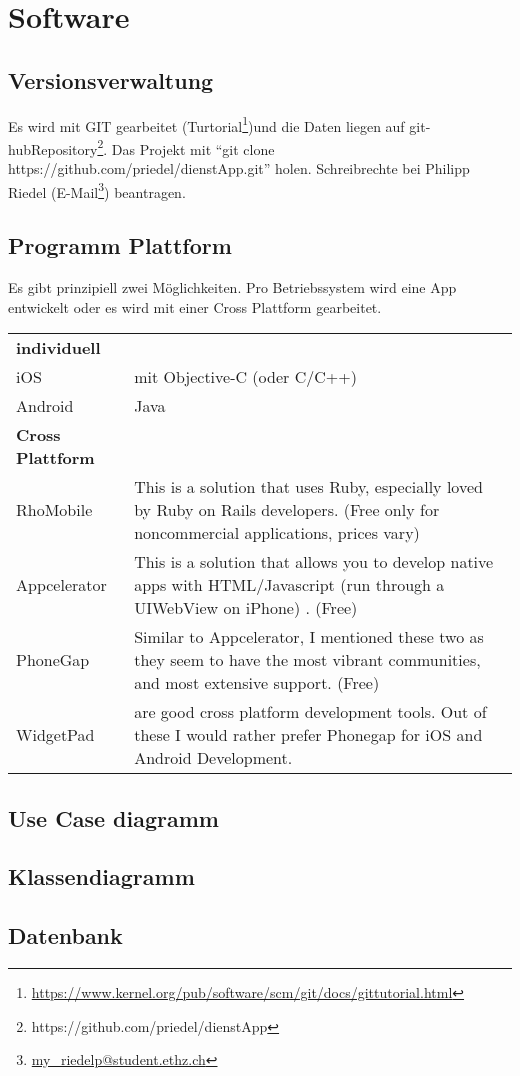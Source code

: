 \chapter{Software}

\section{Versionsverwaltung}
Es wird mit GIT gearbeitet (Turtorial\footnote{\url{https://www.kernel.org/pub/software/scm/git/docs/gittutorial.html}})und die Daten liegen auf git-hub{Repository\footnote{https://github.com/priedel/dienstApp}}. Das Projekt mit \enquote{git clone https://github.com/priedel/dienstApp.git} holen.
 Schreibrechte bei Philipp Riedel (E-Mail\footnote{\href{mailto:riedelp@student.ethz.ch}{my\_riedelp@student.ethz.ch}}) beantragen.

\section{Programm Plattform}

Es gibt prinzipiell zwei Möglichkeiten. Pro Betriebssystem wird eine App entwickelt oder es wird mit einer Cross Plattform gearbeitet\cite{appEinf}.


\begin{tabularx}{\textwidth}{lX}
\textbf{individuell}\cite{appEinf}&\\
iOS & mit  Objective-C (oder C/C++)\\
Android & Java \\
\textbf{Cross Plattform}\cite{crossPlat}&\\
    RhoMobile & This is a solution that uses Ruby, especially loved by Ruby on Rails developers. (Free only for noncommercial applications, prices vary)\\
    Appcelerator & This is a solution that allows you to develop native apps with HTML/Javascript (run through a UIWebView on iPhone) . (Free)\\
    PhoneGap & Similar to Appcelerator, I mentioned these two as they seem to have the most vibrant communities, and most extensive support. (Free)\\
    WidgetPad & are good cross platform development tools. Out of these I would rather prefer Phonegap for iOS and Android Development.\\
\end{tabularx}
\centering{{$\vdots$}}

\section{Use Case diagramm}
\section{Klassendiagramm}

\section{Datenbank}

